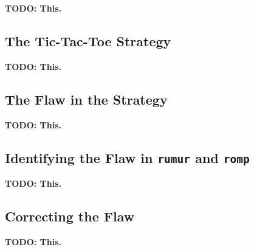 
\textbf{TODO: This.}

\subsection{The Tic-Tac-Toe Strategy}\label{subsec:the-tic-tac-toe-strategy}

\textbf{TODO: This.}

\subsection{The Flaw in the Strategy}\label{subsec:the-flaw-in-the-strategy}

\textbf{TODO: This.}

\subsection{Identifying the Flaw in \texttt{rumur} and \texttt{romp}}\label{subsec:identifying-the-flaw-in-rumur-and-romp}

\textbf{TODO: This.}

\subsection{Correcting the Flaw}\label{subsec:correcting-the-flaw}

\textbf{TODO: This.}
